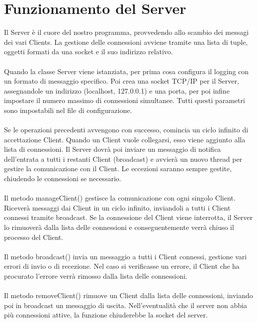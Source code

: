 \documentclass[a4paper,12pt]{report}
\begin{document}
    \chapter*{Funzionamento del Server}

        Il Server è il cuore del nostro programma, provvedendo allo scambio dei messagi dei vari Clients.
        La gestione delle connessioni avviene tramite una lista di tuple, oggetti formati da una socket e il suo indirizzo relativo.
        \\ \\
        Quando la classe Server viene istanziata, per prima cosa configura il logging con un formato di messaggio specifico.
        Poi crea una socket TCP/IP per il Server, assegnandole un indirizzo (localhost, 127.0.0.1) e una porta, per poi infine impostare il numero massimo di connessioni simultanee.
        Tutti questi parametri sono impostabili nel file di configurazione.
        \\ \\
        Se le operazioni precedenti avvengono con successo, comincia un ciclo infinito di accettazione Client.
        Quando un Client vuole collegarsi, esso viene aggiunto alla lista di connessioni.
        Il Server dovrà poi inviare un messaggio di notifica dell'entrata a tutti i restanti Client (broadcast) e avvierà un nuovo thread per gestire la comunicazione con il Client.
        Le eccezioni saranno sempre gestite, chiudendo le connessioni se necessario.
        \\ \\
        Il metodo manageClient() gestisce la comunicazione con ogni singolo Client.
        Riceverà messaggi dai Client in un ciclo infinito, inviandoli a tutti i Client connessi tramite broadcast.
        Se la connessione del Client viene interrotta, il Server lo rimuoverà dalla lista delle connessioni e conseguentemente verrà chiuso il processo del Client.
        \\ \\
        Il metodo broadcast() invia un messaggio a tutti i Client connessi, gestione vari errori di invio o di recezione. Nel caso si verificasse un errore, il Client che ha procurato l'errore verrà rimosso dalla lista delle connessioni.
        \\ \\
        Il metodo removeClient() rimuove un Client dalla lista delle connessioni, inviando poi in broadcast un messaggio di uscita. Nell'eventualità che il server non abbia più connessioni attive, la funzione chiuderebbe la socket del server.
\end{document}
